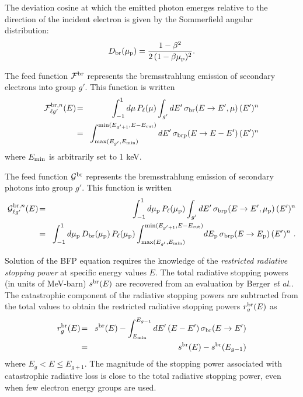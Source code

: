 \noindent The deviation cosine at which the emitted photon emerges
relative to the direction of the incident electron is given by the
Sommerfield angular distribution\cite{SANDYL}:
  \begin{equation}
    D_{\rm br}(\mu_{\rm p}) = {1-\beta^2 \over 2\,(1-\beta \mu_{\rm p})^2} .
  \end{equation}

The feed function ${\cal F}^{\rm br}$ represents the bremsstrahlung
emission of secondary electrons into group $g'$. This function is written
  \begin{eqnarray}
    \nonumber {\cal F}^{{\rm br},n}_{\ell g'}(E) \negthinspace
    &=& \negthinspace \int_{-1}^1 d\mu \,P_\ell(\mu)\int_{g'} dE'
    \, \sigma_{\rm br}(E\rightarrow E',\mu)\,(E')^n \\
    &=& \negthinspace
    \int_{\max(E_{g'},E_{\rm min})}^{\min(E_{g'+1},E-E_{\rm cut})} dE' \,
    \sigma_{\rm brp}(E\rightarrow E-E')\,(E')^n
  \label{elr_eq15}
  \end{eqnarray}
\noindent where $E_{\rm min}$ is arbitrarily set to 1 keV.

The feed function ${\cal G}^{\rm br}$ represents the bremsstrahlung
emission of secondary photons into group $g'$. This function is written
  \begin{eqnarray}
    \nonumber {\cal G}^{{\rm br},n}_{\ell g'}(E) \negthinspace
    &=& \negthinspace \int_{-1}^1 d\mu_{\rm p} \,P_\ell(\mu_{\rm p})\int_{g'}
    dE' \, \sigma_{\rm brp}(E\rightarrow E',\mu_{\rm p})\,(E')^n \\
    \nonumber &=& \negthinspace \int_{-1}^1 d\mu_{\rm p} \,
    D_{\rm br}(\mu_{\rm p})\, P_\ell(\mu_{\rm p})
    \int_{\max(E_{g'},E_{\rm min})}^{\min(E_{g'+1},E-E_{\rm cut})}
    \negthinspace dE_{\rm p} \,\sigma_{\rm brp}(E\rightarrow E_{\rm p})\,
    (E')^n \, \, .\\
  \label{elr_eq16}
  \end{eqnarray}

Solution of the BFP equation requires the knowledge of the {\sl restricted
radiative stopping power}  at specific
energy values $E$. The total radiative stopping powers (in units of MeV-barn)
$s^{\rm br}(E)$ are recovered from an evaluation by Berger
{\sl et al.}\cite{ICRU37}. The catastrophic component of the radiative
stopping powers are subtracted from the total values to obtain the
restricted radiative stopping powers $r_g^{\rm br}(E)$ as
  \begin{eqnarray}
   \nonumber r_g^{\rm br}(E) \negthinspace &=& \negthinspace s^{\rm br}(E) -
     \int_{E_{\rm min}}^{E_{g-1}} dE' \, (E-E')\,
     \sigma_{\rm br}(E\rightarrow E') \\
     &=& \negthinspace s^{\rm br}(E)-s^{\rm br}(E_{g-1})
  \label{elr_eq17}
  \end{eqnarray}
\noindent where $E_g < E \le E_{g+1}$. The magnitude of the stopping
power associated with catastrophic radiative loss is close to the total
radiative stopping power, even when few electron energy groups are used.

